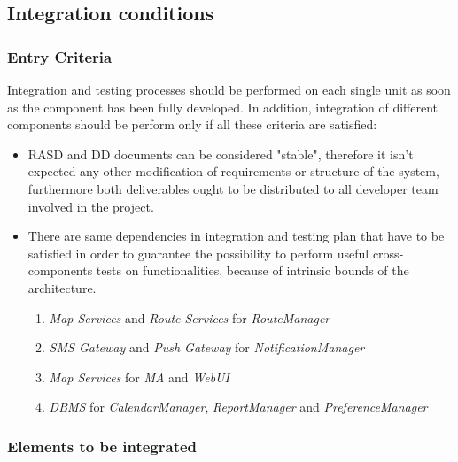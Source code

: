 
\subsection{Integration conditions}

\subsubsection{Entry Criteria}

Integration and testing processes should be performed on each single unit as soon as the component has been fully developed. In addition, integration of different components should be perform only if all these criteria are satisfied:

\begin{itemize}
	\item RASD and DD documents can be considered "stable", therefore it isn't expected any other modification of requirements or structure of the system, furthermore both deliverables ought to be distributed to all developer team involved in the project.
	\item There are same dependencies in integration and testing plan that have to be satisfied in order to guarantee the possibility to perform useful cross-components tests on functionalities, because of intrinsic bounds of the architecture.
	\begin{enumerate}
		\item \textit{Map Services} and \textit{Route Services} for \textit{RouteManager}
		\item \textit{SMS Gateway} and \textit{Push Gateway} for \textit{NotificationManager}
		\item \textit{Map Services} for \textit{MA} and \textit{WebUI}
		\item \textit{DBMS} for \textit{CalendarManager}, \textit{ReportManager} and \textit{PreferenceManager}
		\end{enumerate}
\end{itemize}

\subsubsection{Elements to be integrated}


